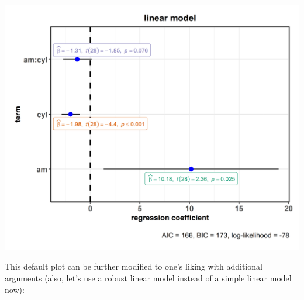 \documentclass[
]{article}
\begin{document}
\includegraphics[width=1\linewidth]{./figures/paper-ggcoefstats1-1}

This default plot can be further modified to one's liking with additional arguments
(also, let's use a robust linear model instead of a simple linear model now):
\end{document}
